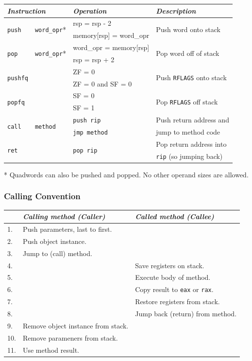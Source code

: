 \documentclass[twocolumn,english]{article}
\providecommand{\tabularnewline}{\\}
\begin{document}
\begin{table}[H]
\noindent \centering{}\texttt{\footnotesize{}}%
\begin{tabular}{llll}
\toprule 
\multicolumn{2}{l}{\emph{Instruction}} & \emph{Operation} & \emph{Description}\tabularnewline
\midrule
\multirow{2}{*}{\texttt{push}} & \multirow{2}{*}{\texttt{word\_opr}{*}} & rsp = rsp - 2 & \multirow{2}{*}{Push word onto stack}\tabularnewline
 &  & memory{[}rsp{]} = word\_opr & \tabularnewline
\multirow{2}{*}{\texttt{pop}} & \multirow{2}{*}{\texttt{word\_opr}{*}} & word\_opr = memory{[}rsp{]} & \multirow{2}{*}{Pop word off of stack}\tabularnewline
 &  & rsp = rsp + 2 & \tabularnewline
\multirow{2}{*}{\texttt{pushfq}} & \multirow{2}{*}{} & ZF = 0 & \multirow{2}{*}{Push \texttt{RFLAGS} onto stack}\tabularnewline
 &  & ZF = 0 and SF = 0 & \tabularnewline
\multirow{2}{*}{\texttt{popfq}} & \multirow{2}{*}{} & SF = 0 & \multirow{2}{*}{Pop \texttt{RFLAGS} off stack}\tabularnewline
 &  & SF = 1 & \tabularnewline
\multirow{2}{*}{\texttt{call}} & \multirow{2}{*}{\texttt{method}} & \texttt{push rip} & Push return address and\tabularnewline
 &  & \texttt{jmp method} & jump to method code\tabularnewline
\multirow{2}{*}{\texttt{ret}} & \multirow{2}{*}{} & \multirow{2}{*}{\texttt{pop rip}} & Pop return address into\tabularnewline
 &  &  & \texttt{rip} (so jumping back)\tabularnewline
\bottomrule
\end{tabular}
\end{table}


{*} Quadwords can also be pushed and popped. No other operand sizes
are allowed.


\subsubsection{Calling Convention}

\begin{table}[H]
\noindent \centering{}{\footnotesize{}}%
\begin{tabular}{lll}
\toprule 
\multicolumn{1}{l}{} & \emph{Calling method (Caller)} & \emph{Called method (Callee)}\tabularnewline
\midrule
1. & Push parameters, last to first. & \tabularnewline
2. & Push object instance. & \tabularnewline
3. & Jump to (call) method. & \tabularnewline
4. &  & Save registers on stack.\tabularnewline
5. &  & Execute body of method.\tabularnewline
6. &  & Copy result to \texttt{eax} or \texttt{rax}.\tabularnewline
7. &  & Restore registers from stack.\tabularnewline
8. &  & Jump back (return) from method.\tabularnewline
9. & Remove object instance from stack. & \multirow{1}{*}{}\tabularnewline
10. & Remove parameners from stack. & \tabularnewline
11. & Use method result. & \tabularnewline
\bottomrule
\end{tabular}
\end{table}
\end{document}
